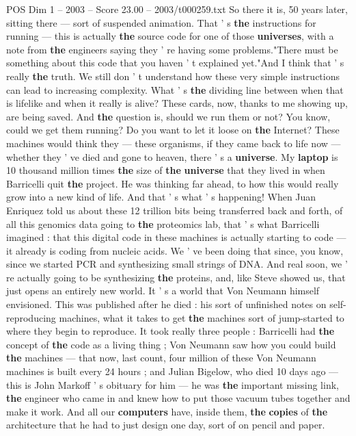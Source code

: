 \begin{textsample}{POS Dim 1 – 2003 – Score 23.00 – 2003/t000259.txt}
So there it is, 50 years later, sitting there — sort of suspended animation.
That ' s \textbf{the} instructions for running — this is actually \textbf{the} source code for one of those \textbf{universes}, with a note from \textbf{the} engineers saying they ' re having some problems."There must be something about this code that you haven ' t explained yet."And I think that ' s really \textbf{the} truth.
We still don ' t understand how these very simple instructions can lead to increasing complexity.
What ' s \textbf{the} dividing line between when that is lifelike and when it really is alive?
These cards, now, thanks to me showing up, are being saved.
And \textbf{the} question is, should we run them or not?
You know, could we get them running?
Do you want to let it loose on \textbf{the} Internet?
These machines would think they — these organisms, if they came back to life now — whether they ' ve died and gone to heaven, there ' s a \textbf{universe}.
My \textbf{laptop} is 10 thousand million times \textbf{the} size of \textbf{the} \textbf{universe} that they lived in when Barricelli quit \textbf{the} project.
He was thinking far ahead, to how this would really grow into a new kind of life.
And that ' s what ' s happening!
When Juan Enriquez told us about these 12 trillion bits being transferred back and forth, of all this genomics data going to \textbf{the} proteomics lab, that ' s what Barricelli imagined : that this digital code in these machines is actually starting to code — it already is coding from nucleic acids.
We ' ve been doing that since, you know, since we started PCR and synthesizing small strings of DNA.
And real soon, we ' re actually going to be synthesizing \textbf{the} proteins, and, like Steve showed us, that just opens an entirely new world.
It ' s a world that Von Neumann himself envisioned.
This was published after he died : his sort of unfinished notes on self-reproducing machines, what it takes to get \textbf{the} machines sort of jump-started to where they begin to reproduce.
It took really three people : Barricelli had \textbf{the} concept of \textbf{the} code as a living thing ; Von Neumann saw how you could build \textbf{the} machines — that now, last count, four million of these Von Neumann machines is built every 24 hours ; and Julian Bigelow, who died 10 days ago — this is John Markoff ' s obituary for him — he was \textbf{the} important missing link, \textbf{the} engineer who came in and knew how to put those vacuum tubes together and make it work.
And all our \textbf{computers} have, inside them, \textbf{the} \textbf{copies} of \textbf{the} architecture that he had to just design one day, sort of on pencil and paper.

\end{textsample}
